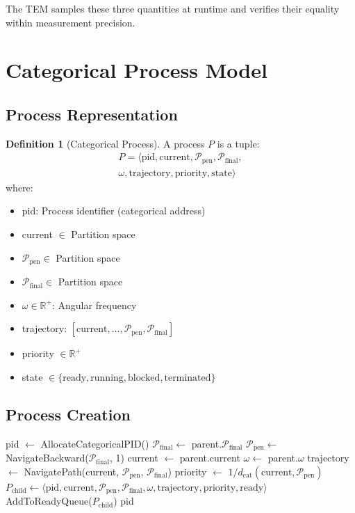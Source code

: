\documentclass[twocolumn,10pt]{article}
\theoremstyle{definition}
\newtheorem{definition}[theorem]{Definition}
\theoremstyle{remark}
\newcommand{\pentstate}{\mathcal{P}_{\text{pen}}}
\newcommand{\finalstate}{\mathcal{P}_{\text{final}}}
\newcommand{\dcat}{d_{\text{cat}}}
\begin{document}
The TEM samples these three quantities at runtime and verifies their equality within measurement precision.

\section{Categorical Process Model}
\label{sec:process_model}

\subsection{Process Representation}

\begin{definition}[Categorical Process]
A process $P$ is a tuple:
\begin{multline}
    P = \langle \text{pid}, \text{current}, \pentstate, \finalstate, \\
    \omega, \text{trajectory}, \text{priority}, \text{state} \rangle
\end{multline}
where:
\begin{itemize}
    \item pid: Process identifier (categorical address)
    \item current $\in$ Partition space
    \item $\pentstate \in$ Partition space
    \item $\finalstate \in$ Partition space
    \item $\omega \in \mathbb{R}^+$: Angular frequency
    \item trajectory: $[\text{current}, \ldots, \pentstate, \finalstate]$
    \item priority $\in \mathbb{R}^+$
    \item state $\in \{\text{ready}, \text{running}, \text{blocked}, \text{terminated}\}$
\end{itemize}
\end{definition}

\subsection{Process Creation}

\begin{algorithm}
\caption{Process Creation (Fork)}
\begin{algorithmic}[1]
    \State pid $\gets$ AllocateCategoricalPID()
    \State $\finalstate \gets$ parent.$\finalstate$
    \State $\pentstate \gets$ NavigateBackward($\finalstate$, 1)
    \State current $\gets$ parent.current
    \State $\omega \gets$ parent.$\omega$
    \State trajectory $\gets$ NavigatePath(current, $\pentstate$, $\finalstate$)
    \State priority $\gets$ $1 / \dcat(\text{current}, \pentstate)$
    \State $P_{\text{child}} \gets \langle \text{pid}, \text{current}, \pentstate, \finalstate, \omega, \text{trajectory}, \text{priority}, \text{ready} \rangle$
    \State AddToReadyQueue($P_{\text{child}}$)
    \State \Return pid
\EndFunction
\end{algorithmic}
\end{algorithm}
\end{document}
